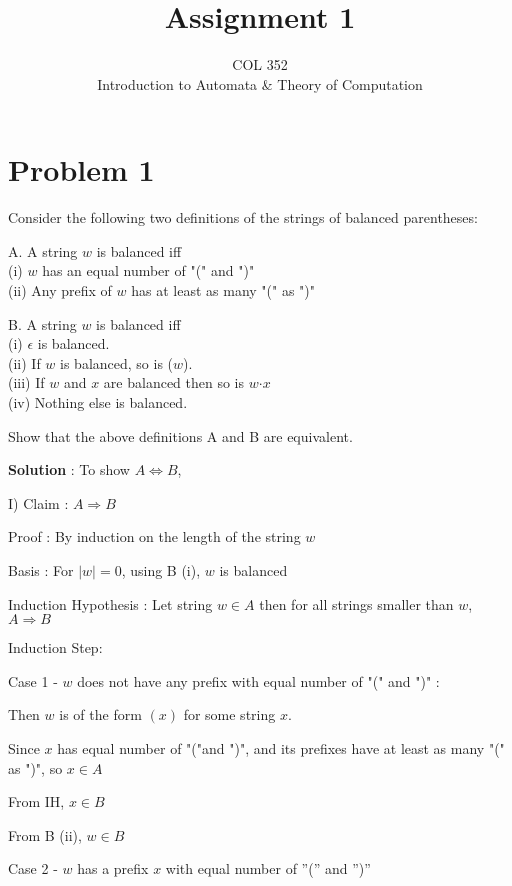 \documentclass{article}
\title{Assignment 1}
\author{COL 352\\
    Introduction to Automata \& 
    Theory of Computation}
\date{}
\begin{document}
    \maketitle
    
    \section*{Problem 1} Consider the following two definitions of the strings of balanced parentheses:
    
    A. A string $w$ is balanced iff \\
    (i) $w$ has an equal number of "(" and ")"\\
    (ii) Any prefix of $w$ has at least as many "(" as ")"
    
    B. A string $w$ is balanced iff\\
    (i) $\epsilon $ is balanced.\\
    (ii) If $w$ is balanced, so is ($w$).\\
    (iii) If $w$ and $x$ are balanced then so is $w\textrm{·}x$\\
    (iv) Nothing else is balanced.
    
    Show that the above definitions A and B are equivalent.
    
    
    \textbf{Solution} : To show $A \iff B$,
    
    I) Claim : $A \Longrightarrow B$
    
    Proof : By induction on the length of the string $w$
    
    Basis : For $|w| = 0$, using B (i), $w$ is balanced
    
    Induction Hypothesis : Let string $w \in A$ then for all strings smaller than $w$, $A \Longrightarrow B$
    
    Induction Step:
    
    \quad Case 1 - $w$ does not have any prefix with equal number of "(" and ")" : 
    
    \qquad Then $w$ is of the form $( x )$ for some string $x$. 
    
    \qquad Since $x$ has equal number of "("and ")", and its prefixes have at least as many "(" as ")", so $x \in A$
    
    \qquad From IH,  $x \in B$
    
    \qquad From B (ii),  $w \in B$
    
    
    
    \quad Case 2 - $w$ has a prefix $x$ with equal number of ”(” and ”)”
    
\end{document}
